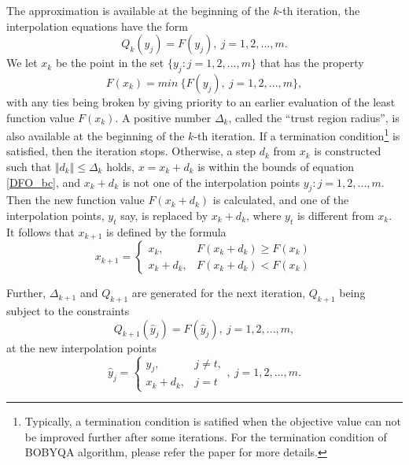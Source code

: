 \documentclass  [
  paper    = a4,
  BCOR     = 10mm,
  twoside,
  fontsize = 12pt,
  fleqn,
  toc      = bibnumbered,
  toc      = listofnumbered,
  numbers  = noendperiod,
  headings = normal,
  listof   = leveldown,
  version  = 3.03
]                                       {scrreprt}
\newcommand{\<}{\langle}
\renewcommand{\>}{\rangle}
\begin{document}
The approximation is available at the beginning of the $k$-th iteration, the interpolation equations have the form
\begin{equation}
	Q_k(y_j)= F(y_j),\   j = 1, 2, ..., m.
\end{equation}
We let $x_k$ be the point in the set $\{y_j : j = 1, 2, ... , m\}$ that has the property
\begin{equation}
	F(x_k)= min\ \{F(y_j), \  j = 1, 2, ..., m\}, 
\end{equation}
with any ties being broken by giving priority to an earlier evaluation of the least function value $F(x_k)$. A positive number $\Delta_k$, called the “trust region radius”, is also available at the beginning of the $k$-th iteration. If a termination condition\footnote{Typically, a termination condition is satified when the objective value can not be improved further after some iterations. For the termination condition of BOBYQA algorithm, please refer the paper \cite{MicPow09} for more details.} is satisfied, then the iteration stops. Otherwise, a step $d_k$ from $x_k$ is constructed such that $ \Vert d_k \Vert \leq \Delta_k $ holds, $x = x_k+d_k$ is within the bounds of equation \ref{DFO_bc}, and $x_k+d_k$ is not one of the interpolation points $y_j : j = 1, 2, ... , m$. Then the new function value $F(x_k+d_k)$ is calculated, and one of the interpolation points, $y_t$ say, is replaced by $x_k+d_k$, where $y_t$ is different from $x_k$. It follows that $x_{k+1}$ is defined by the formula
\begin{equation}
	x_{k+1} =
	\begin{cases}
		x_k, & F(x_k+d_k) \geq F(x_k) \\
		x_k+d_k  , & F(x_k+d_k) < F(x_k) 
	\end{cases}
\end{equation}

Further, $\Delta_{k+1}$ and $Q_{k+1}$ are generated for the next iteration, $Q_{k+1}$ being subject to the constraints 
\begin{equation}
	Q_{k+1}(\hat{y}_j)= F(\hat{y}_j), \  j = 1, 2, ..., m, 
\end{equation}
at the new interpolation points
\begin{equation}
	\hat{y}_j =
	\begin{cases}
		y_j, & j \neq t, \\
		x_k+d_k  , & j =t 
	\end{cases},  \  j = 1, 2, ..., m.
\end{equation}
\end{document}
